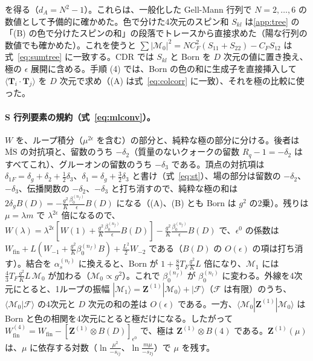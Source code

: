 \documentclass[a4paper,10pt]{ltjsarticle}
\newcommand{\MSbar}{\overline{\mathrm{MS}}}
\begin{document}
を得る（$d_A=N^2-1$）。これらは、一般化した Gell-Mann 行列で $N=2,\dots,6$ の数値として予備的に確かめた。色で分けた4次元のスピン和 $S_{kl}$ は\ref{app:tree} の「(B) の色で分けたスピンの和」の段落でトレースから直接求めた（陽な行列の数値でも確かめた）。これを使うと $\sum|\mathcal M_0|^2=NC_F^2(S_{11}+S_{22})-C_FS_{12}$ は式~\eqref{eq:sumtree} に一致する。CDR では $S_{kl}$ と Born を $D$ 次元の値に置き換え、極の $\epsilon$ 展開に含める。手順 (4) では、Born の色の和に生成子を直接挿入して $\langle\boldsymbol T_i\cdot\boldsymbol T_j\rangle$ を $D$ 次元で求め（(A) は式~\eqref{eq:colcorr} に一致）、それを極の比較に使った。

\paragraph{S 行列要素の規約（式~\eqref{eq:mlconv}）。}$W$ を、ループ積分（$\mu^{2\epsilon}$ を含む）の部分と、純粋な極の部分に分ける。後者は $\MSbar$ の対抗項と、留数のうち $-\delta_2$（質量のないクォークの留数 $R_q-1=-\delta_2$ はすべてこれ）、グルーオンの留数のうち $-\delta_3$ である。頂点の対抗項は $\delta_{1F}=\delta_g+\delta_2+\frac12\delta_3$、$\delta_1=\delta_g+\frac32\delta_3$ と書け（式~\eqref{eq:st}）、場の部分は留数の $-\delta_2$、$-\delta_3$、伝播関数の $-\delta_2$、$-\delta_3$ と打ち消すので、純粋な極の和は $2\delta_gB(D)=-\frac{g^2}{K}\frac{\beta_0^{(n_f)}}{\epsilon}B(D)$ になる（(A)、(B) とも Born は $g^2$ の2乗）。残りは $\mu=\lambda m$ で $\lambda^{2\epsilon}$ 倍になるので、$W(\lambda)=\lambda^{2\epsilon}[W(1)+\frac{g^2}K\frac{\beta_0^{(n_f)}}{\epsilon}B(D)]-\frac{g^2}K\frac{\beta_0^{(n_f)}}{\epsilon}B(D)$ で、$\epsilon^0$ の係数は $W_{\mathrm{fin}}+L(W_{-1}+\frac{g^2}K\beta_0^{(n_f)}B)+\frac{L^2}2W_{-2}$ である（$B(D)$ の $O(\epsilon)$ の項は打ち消す）。結合を $\alpha_s^{(n_l)}$ に換えると、Born が $1+\frac83T_F\frac{g^2}KL$ 倍になり、$\mathcal M_1$ には $\frac43T_F\frac{g^2}{K}L\,\mathcal M_0$ が加わる（$\mathcal M_0\propto g^2$）。これで $\beta_0^{(n_f)}$ が $\beta_0^{(n_l)}$ に変わる。外線を4次元にとると、1ループの振幅 $|\mathcal M_1\rangle=\boldsymbol Z^{(1)}|\mathcal M_0\rangle+|\mathcal F\rangle$（$\mathcal F$ は有限）のうち、$\langle\mathcal M_0|\mathcal F\rangle$ の4次元と $D$ 次元の和の差は $O(\epsilon)$ である。一方、$\langle\mathcal M_0|\boldsymbol Z^{(1)}|\mathcal M_0\rangle$ は Born と色の相関を4次元にとると極だけになる。したがって $W^{(4)}_{\mathrm{fin}}=W_{\mathrm{fin}}-[\boldsymbol Z^{(1)}\otimes B(D)]_{\epsilon^0}$ で、極は $\boldsymbol Z^{(1)}\otimes B(4)$ である。$\boldsymbol Z^{(1)}(\mu)$ は、$\mu$ に依存する対数（$\ln\frac{\mu^2}{-s_{ij}}$、$\ln\frac{m\mu}{-s_{Ij}}$）で $\mu$ を残す。
\end{document}

